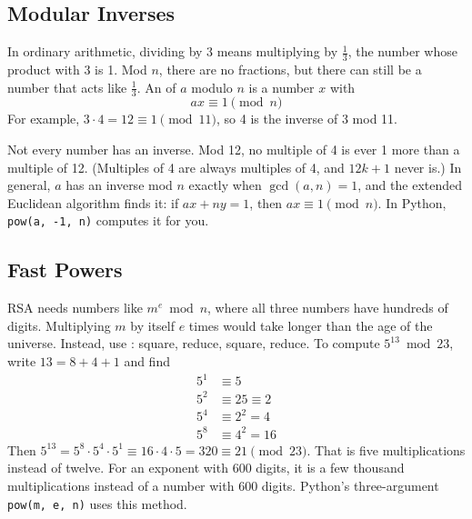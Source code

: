 \subsection{Modular Inverses}
In ordinary arithmetic, dividing by 3 means multiplying by $\frac{1}{3}$, the
number whose product with 3 is 1. Mod $n$, there are no fractions, but there can
still be a number that acts like $\frac{1}{3}$. An  of $a$
modulo $n$ is a number $x$ with
$$ax \equiv 1 \pmod{n}$$
For example, $3 \cdot 4 = 12 \equiv 1 \pmod{11}$, so 4 is the inverse of 3 mod
11.

Not every number has an inverse. Mod 12, no multiple of 4 is ever 1 more than a
multiple of 12. (Multiples of 4 are always multiples of 4, and $12k + 1$ never
is.) In general, $a$ has an inverse mod $n$ exactly when $\gcd(a, n) = 1$, and
the extended Euclidean algorithm finds it: if $ax + ny = 1$, then
$ax \equiv 1 \pmod{n}$. In Python, \texttt{pow(a, -1, n)} computes
it for you.

\subsection{Fast Powers}
RSA needs numbers like $m^{e} \bmod n$, where all three numbers have hundreds of
digits. Multiplying $m$ by itself $e$ times would take longer than the age of
the universe. Instead, use : square, reduce,
square, reduce. To compute $5^{13} \bmod 23$, write $13 = 8 + 4 + 1$ and find
\begin{align*}
5^1 &\equiv 5 \\
5^2 &\equiv 25 \equiv 2 \\
5^4 &\equiv 2^2 = 4 \\
5^8 &\equiv 4^2 = 16
\end{align*}
Then $5^{13} = 5^8 \cdot 5^4 \cdot 5^1 \equiv 16 \cdot 4 \cdot 5 = 320 \equiv 21
\pmod{23}$. That is five multiplications instead of twelve. For an exponent with
600 digits, it is a few thousand multiplications instead of a number with 600
digits. Python's three-argument \texttt{pow(m, e, n)} uses this
method.

